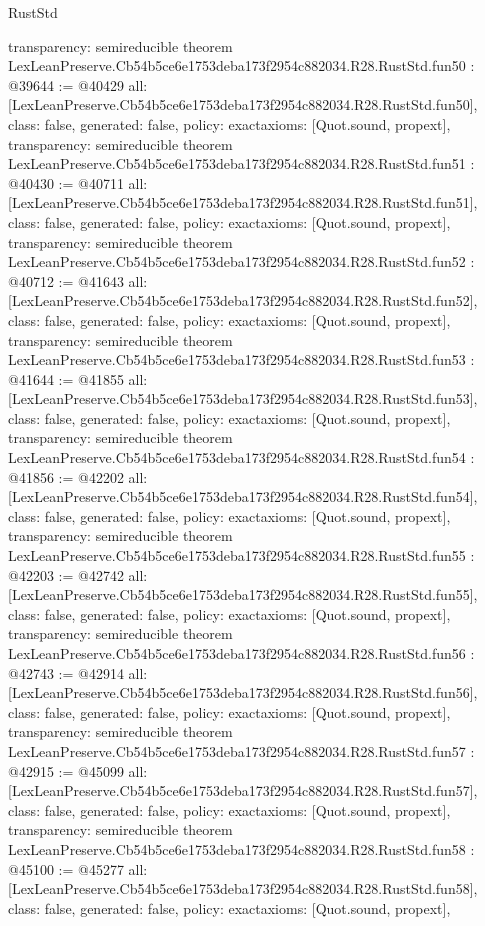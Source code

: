 \begin{lexlean}{RustStd}
\begin{coremodule}
{  transparency: semireducible
}
theorem LexLeanPreserve.Cb54b5ce6e1753deba173f2954c882034.R28.RustStd.fun50 : @39644 := @40429 {
  all: [LexLeanPreserve.Cb54b5ce6e1753deba173f2954c882034.R28.RustStd.fun50],
  class: false,
  generated: false,
  policy: exact{axioms: [Quot.sound, propext]},
  transparency: semireducible
}
theorem LexLeanPreserve.Cb54b5ce6e1753deba173f2954c882034.R28.RustStd.fun51 : @40430 := @40711 {
  all: [LexLeanPreserve.Cb54b5ce6e1753deba173f2954c882034.R28.RustStd.fun51],
  class: false,
  generated: false,
  policy: exact{axioms: [Quot.sound, propext]},
  transparency: semireducible
}
theorem LexLeanPreserve.Cb54b5ce6e1753deba173f2954c882034.R28.RustStd.fun52 : @40712 := @41643 {
  all: [LexLeanPreserve.Cb54b5ce6e1753deba173f2954c882034.R28.RustStd.fun52],
  class: false,
  generated: false,
  policy: exact{axioms: [Quot.sound, propext]},
  transparency: semireducible
}
theorem LexLeanPreserve.Cb54b5ce6e1753deba173f2954c882034.R28.RustStd.fun53 : @41644 := @41855 {
  all: [LexLeanPreserve.Cb54b5ce6e1753deba173f2954c882034.R28.RustStd.fun53],
  class: false,
  generated: false,
  policy: exact{axioms: [Quot.sound, propext]},
  transparency: semireducible
}
theorem LexLeanPreserve.Cb54b5ce6e1753deba173f2954c882034.R28.RustStd.fun54 : @41856 := @42202 {
  all: [LexLeanPreserve.Cb54b5ce6e1753deba173f2954c882034.R28.RustStd.fun54],
  class: false,
  generated: false,
  policy: exact{axioms: [Quot.sound, propext]},
  transparency: semireducible
}
theorem LexLeanPreserve.Cb54b5ce6e1753deba173f2954c882034.R28.RustStd.fun55 : @42203 := @42742 {
  all: [LexLeanPreserve.Cb54b5ce6e1753deba173f2954c882034.R28.RustStd.fun55],
  class: false,
  generated: false,
  policy: exact{axioms: [Quot.sound, propext]},
  transparency: semireducible
}
theorem LexLeanPreserve.Cb54b5ce6e1753deba173f2954c882034.R28.RustStd.fun56 : @42743 := @42914 {
  all: [LexLeanPreserve.Cb54b5ce6e1753deba173f2954c882034.R28.RustStd.fun56],
  class: false,
  generated: false,
  policy: exact{axioms: [Quot.sound, propext]},
  transparency: semireducible
}
theorem LexLeanPreserve.Cb54b5ce6e1753deba173f2954c882034.R28.RustStd.fun57 : @42915 := @45099 {
  all: [LexLeanPreserve.Cb54b5ce6e1753deba173f2954c882034.R28.RustStd.fun57],
  class: false,
  generated: false,
  policy: exact{axioms: [Quot.sound, propext]},
  transparency: semireducible
}
theorem LexLeanPreserve.Cb54b5ce6e1753deba173f2954c882034.R28.RustStd.fun58 : @45100 := @45277 {
  all: [LexLeanPreserve.Cb54b5ce6e1753deba173f2954c882034.R28.RustStd.fun58],
  class: false,
  generated: false,
  policy: exact{axioms: [Quot.sound, propext]},
}
\end{coremodule}
\end{lexlean}
